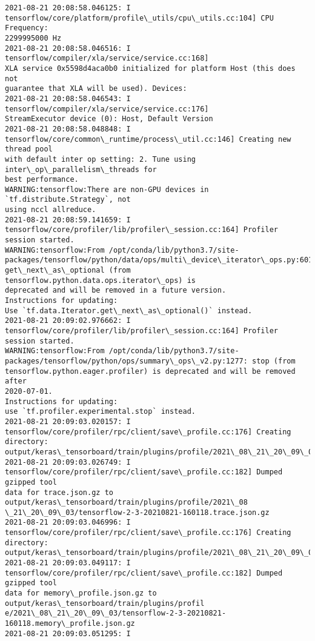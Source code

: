\documentclass[11pt]{article}
\begin{document}
    \begin{Verbatim}[commandchars=\\\{\}]
2021-08-21 20:08:58.046125: I
tensorflow/core/platform/profile\_utils/cpu\_utils.cc:104] CPU Frequency:
2299995000 Hz
2021-08-21 20:08:58.046516: I tensorflow/compiler/xla/service/service.cc:168]
XLA service 0x5598d4aca0b0 initialized for platform Host (this does not
guarantee that XLA will be used). Devices:
2021-08-21 20:08:58.046543: I tensorflow/compiler/xla/service/service.cc:176]
StreamExecutor device (0): Host, Default Version
2021-08-21 20:08:58.048848: I
tensorflow/core/common\_runtime/process\_util.cc:146] Creating new thread pool
with default inter op setting: 2. Tune using inter\_op\_parallelism\_threads for
best performance.
WARNING:tensorflow:There are non-GPU devices in `tf.distribute.Strategy`, not
using nccl allreduce.
2021-08-21 20:08:59.141659: I
tensorflow/core/profiler/lib/profiler\_session.cc:164] Profiler session started.
WARNING:tensorflow:From /opt/conda/lib/python3.7/site-
packages/tensorflow/python/data/ops/multi\_device\_iterator\_ops.py:601:
get\_next\_as\_optional (from tensorflow.python.data.ops.iterator\_ops) is
deprecated and will be removed in a future version.
Instructions for updating:
Use `tf.data.Iterator.get\_next\_as\_optional()` instead.
2021-08-21 20:09:02.976662: I
tensorflow/core/profiler/lib/profiler\_session.cc:164] Profiler session started.
WARNING:tensorflow:From /opt/conda/lib/python3.7/site-
packages/tensorflow/python/ops/summary\_ops\_v2.py:1277: stop (from
tensorflow.python.eager.profiler) is deprecated and will be removed after
2020-07-01.
Instructions for updating:
use `tf.profiler.experimental.stop` instead.
2021-08-21 20:09:03.020157: I
tensorflow/core/profiler/rpc/client/save\_profile.cc:176] Creating directory:
output/keras\_tensorboard/train/plugins/profile/2021\_08\_21\_20\_09\_03
2021-08-21 20:09:03.026749: I
tensorflow/core/profiler/rpc/client/save\_profile.cc:182] Dumped gzipped tool
data for trace.json.gz to output/keras\_tensorboard/train/plugins/profile/2021\_08
\_21\_20\_09\_03/tensorflow-2-3-20210821-160118.trace.json.gz
2021-08-21 20:09:03.046996: I
tensorflow/core/profiler/rpc/client/save\_profile.cc:176] Creating directory:
output/keras\_tensorboard/train/plugins/profile/2021\_08\_21\_20\_09\_03
2021-08-21 20:09:03.049117: I
tensorflow/core/profiler/rpc/client/save\_profile.cc:182] Dumped gzipped tool
data for memory\_profile.json.gz to output/keras\_tensorboard/train/plugins/profil
e/2021\_08\_21\_20\_09\_03/tensorflow-2-3-20210821-160118.memory\_profile.json.gz
2021-08-21 20:09:03.051295: I

\end{Verbatim}
\end{document}

